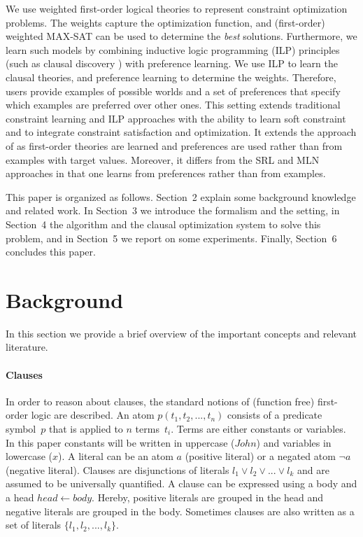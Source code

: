 \documentclass[letterpaper]{article}
\theoremstyle{definition}
\begin{document}
We use weighted first-order logical theories to represent constraint optimization problems.
The weights capture the optimization function, and (first-order) weighted MAX-SAT can be used to determine the \emph{best} solutions.
Furthermore, we learn such models by combining inductive logic programming (ILP) principles (such as clausal discovery \cite{DeRaedt:ClausalDiscovery}) with preference learning.
We use ILP to learn the clausal theories, and preference learning to determine the weights.
Therefore, users provide examples of possible worlds and a set of preferences that specify which examples are preferred over other ones.
This setting extends traditional constraint learning and ILP approaches with the ability to learn soft constraint and to integrate constraint satisfaction and optimization.
It extends the approach of \cite{campigotto2011active} as first-order theories are learned and preferences are used rather than from examples with target values.
Moreover, it differs from the SRL and MLN approaches in that one learns from preferences rather than from examples.

This paper is organized as follows.
Section~2 explain some background knowledge and related work.
In Section~3 we introduce the formalism and the setting, in Section~4 the algorithm and the clausal optimization system to solve this problem, and in Section~5 we report on some experiments.
Finally, Section~6 concludes this paper.


\section{Background}
In this section we provide a brief overview of the important concepts and relevant literature.

\paragraph{Clauses}
In order to reason about clauses, the standard notions of (function free) first-order logic are described.
An atom $p(t_1, t_2, ..., t_n)$ consists of a predicate symbol~$p$ that is applied to $n$ terms~$t_i$.
Terms are either constants or variables.
In this paper constants will be written in uppercase ($\mathit{John}$) and variables in lowercase ($\mathit{x}$).
A literal can be an atom $a$ (positive literal) or a negated atom $\lnot a$ (negative literal).
Clauses are disjunctions of literals $l_1 \lor l_2 \lor ... \lor l_k$ and are assumed to be universally quantified.
A clause can be expressed using a body and a head $\mathit{head} \leftarrow \mathit{body}$.
Hereby, positive literals are grouped in the head and negative literals are grouped in the body.
Sometimes clauses are also written as a set of literals $\{l_1, l_2, ..., l_k\}$.
\end{document}

